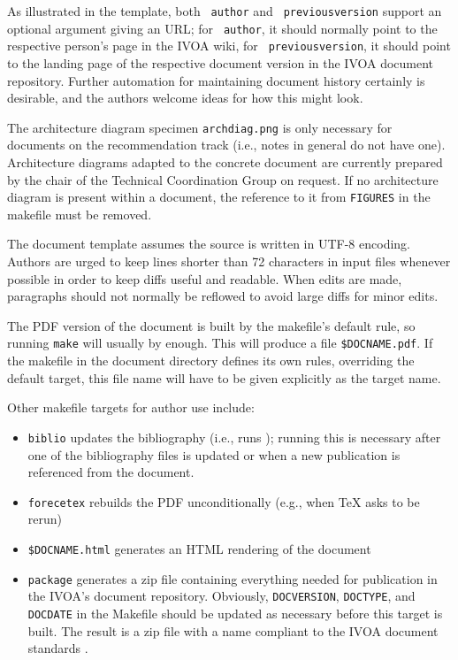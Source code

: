 \documentclass[11pt,a4paper]{ivoa}
\newcommand{\texword}[1]{\texttt{\color{texcolor} #1}}
\begin{document}
As illustrated in the template, both \texword{author} and
\texword{previousversion} support an optional argument giving an URL; for
\texword{author}, it should normally point to the respective person's
page in the IVOA wiki, for \texword{previousversion}, it should point to
the landing page of the respective document version in the IVOA document
repository.  Further automation for maintaining document history
certainly is desirable, and the authors welcome ideas for how this might
look.

The architecture diagram specimen \texttt{archdiag.png} is only
necessary for documents on the recommendation track (i.e., notes in
general do not have one).  Architecture diagrams adapted to the concrete
document are currently prepared by the chair of the Technical
Coordination Group on request.  If no architecture diagram is present
within a document, the reference to it from \texttt{FIGURES} in the
makefile must be removed.

The document template assumes the source is written in UTF-8 encoding.
Authors are urged to keep lines shorter than 72 characters in input
files whenever possible in order to keep diffs useful and readable.
When edits are made, paragraphs should not normally be reflowed to avoid
large diffs for minor edits.

The PDF version of the document is built by the makefile's default rule,
so running \texttt{make} will usually by enough.  This will produce a
file \texttt{\$DOCNAME.pdf}.  If the makefile in the document directory
defines its own rules, overriding the default target, this file name will
have to be given explicitly as the target name.

Other makefile targets for author use include:

\begin{itemize}
\item \texttt{biblio} updates the bibliography (i.e., runs \BibTeX);
running this is necessary after one of the bibliography files is updated
or when a new publication is referenced from the document.
\item \texttt{forecetex} rebuilds the PDF unconditionally (e.g., when TeX
asks to be rerun)
\item \texttt{\$DOCNAME.html} generates an HTML rendering of the document
\item \texttt{package} generates a zip file containing everything needed
for publication in the IVOA's document repository.   Obviously, 
\texttt{DOCVERSION}, \texttt{DOCTYPE}, and \texttt{DOCDATE} in the
Makefile should be updated as necessary before this target is built.
The result is a zip file with a name compliant to the IVOA document
standards \citep{std:docSTD}.
\end{itemize}
\end{document}
